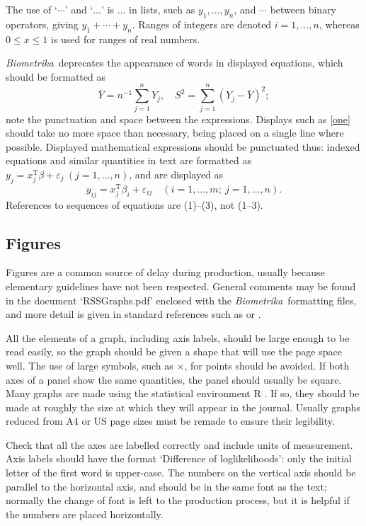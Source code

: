 \documentclass[lineno]{biometrika}
\def\Bka{{\it Biometrika}}
\def\T{{ \mathrm{\scriptscriptstyle T} }}
\def\v{{\varepsilon}}
\begin{document}
The use of `$\cdots$' and `$\ldots$' is  $\ldots$ in lists, such as $y_1,\ldots,y_n$, and $\cdots$ between binary operators,  giving $y_1+\cdots+y_n$.
Ranges of integers are denoted $i=1,\ldots, n$, whereas $0\leq x\leq 1$ is used for ranges of real numbers.  %

\Bka\ deprecates the appearance of words in displayed equations, which should be formatted as
\begin{equation}
\label{one}
\bar Y = n^{-1} \sum_{j=1}^n Y_j,\quad S^2 = \sum_{j=1}^n (Y_j-\bar Y)^2;
\end{equation}
note the punctuation and space between the expressions. Displays such as \eqref{one} should take no more space than necessary, being placed on a single line where possible.  Displayed mathematical expressions should be punctuated thus: indexed equations and similar quantities in text are formatted as
$y_j = x_j^\T\beta + \v_j\ (j=1,\ldots, n)$, and are displayed as
\[
y_{ij} = x_j^\T\beta_i + \v_{ij}\quad (i=1,\ldots, m;\ j=1,\ldots, n).
\]
References to sequences of equations are (1)--(3), not (1--3).

\subsection{Figures}

Figures are a common source of delay during production, usually because elementary guidelines have not been respected.  General comments may be found in the document `RSSGraphs.pdf' enclosed with the \Bka\ formatting files, and more detail is given in standard references such as \citet{Cleveland:1993,Cleveland:1994} or \citet{Tufte:1983}.

All the elements of a graph, including axis labels, should be large enough to be read easily, so the graph should be given a shape that will use the page space well. The use of large symbols, such as $\times$, for points should be avoided. If both axes of a panel show the same quantities, the panel should usually be square.  Many graphs are made using the statistical environment R \citep{R:2010}.  If so, they should be made at roughly the size at which they will appear in the journal.  Usually graphs reduced from A4 or US page sizes must be remade to ensure their legibility.

Check that all the axes are labelled correctly and include units of measurement.  Axis labels should have the format `Difference of loglikelihoods': only the initial letter of the first word is upper-case.
The numbers on the vertical axis should be parallel to the horizontal axis, and should be in the same font as the text; normally the change of font is left to the production process, but it is helpful if the numbers are placed horizontally.
\end{document}
